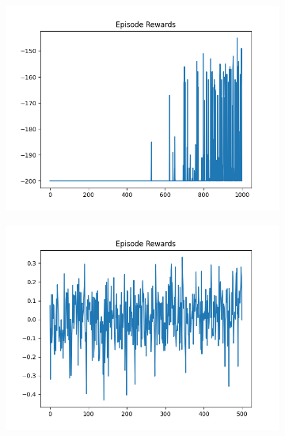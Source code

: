 \begin{figure}[H]
\begin{subfigure}{.47\linewidth}
        \includegraphics[width=\textwidth]{mountain/2024-06-15_12-43-26_dqn_mountaincar_episode_rewards.png}
    \end{subfigure}
    \begin{subfigure}{.47\linewidth}
        \centering
        \includegraphics[width=\textwidth]{mountain/2024-06-15_08-13-32_dqn_mountaincar_episode_rewards.png}
    \end{subfigure}
\end{figure}
